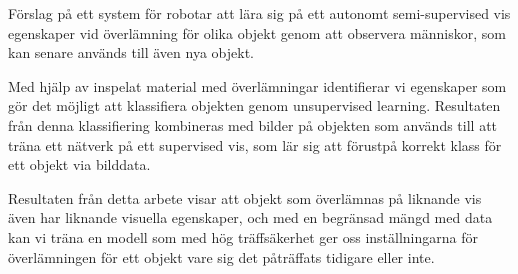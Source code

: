 Förslag på ett system för robotar att lära sig på ett autonomt semi-supervised vis egenskaper vid överlämning för olika objekt genom att observera människor, som kan senare används till även nya objekt.

Med hjälp av inspelat material med överlämningar identifierar vi egenskaper som gör det möjligt att klassifiera objekten genom unsupervised learning. Resultaten från denna klassifiering kombineras med bilder på objekten som används till att träna ett nätverk på ett supervised vis, som lär sig att förustpå korrekt klass för ett objekt via bilddata.

Resultaten från detta arbete visar att objekt som överlämnas på liknande vis även har liknande visuella egenskaper, och med en begränsad mängd med data kan vi träna en modell som med hög träffsäkerhet ger oss inställningarna för överlämningen för ett objekt vare sig det påträffats tidigare eller inte.
